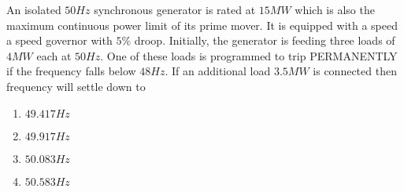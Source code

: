     \item 
    An isolated $50Hz$ synchronous generator is rated at $15MW$ which is also the maximum continuous power limit of its prime mover. It is equipped with a speed a speed governor with $5\%$ droop. Initially, the generator is feeding three loads of $4MW$ each at $50Hz$. One of these loads is programmed to trip PERMANENTLY if the frequency falls below $48Hz$. If an additional load $3.5MW$ is connected then frequency will settle down to
    \hfill{}
    \begin{multicols}{4}
        \begin{enumerate}
            \item $49.417Hz$
            \item $49.917Hz$
            \item $50.083Hz$
            \item $50.583Hz$
        \end{enumerate}
    \end{multicols}
    
